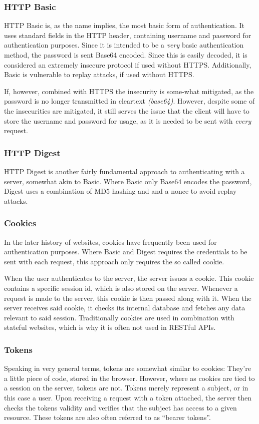 			\subsubsection{HTTP Basic}
				HTTP Basic is, as the name implies, the most basic form of authentication. It uses standard fields in the HTTP header, containing username and password for authentication purposes. Since it is intended to be a \emph{very} basic authentication method, the password is sent Base64 encoded. Since this is easily decoded, it is considered an extremely insecure protocol if used without HTTPS. Additionally, Basic is vulnerable to replay attacks, if used without HTTPS.

				If, however, combined with HTTPS the insecurity is some-what mitigated, as the password is no longer transmitted in cleartext \emph{(base64)}. However, despite some of the insecurities are mitigated, it still serves the issue that the client will have to store the username and password for usage, as it is needed to be sent with \emph{every} request.

			\subsubsection{HTTP Digest}
				HTTP Digest is another fairly fundamental approach to authenticating with a server, somewhat akin to Basic. Where Basic only Base64 encodes the password, Digest uses a combination of MD5 hashing and and a nonce to avoid replay attacks. 

			\subsubsection{Cookies}
				In the later history of websites, cookies have frequently been used for authentication purposes. Where Basic and Digest requires the credentials to be sent with each request, this approach only requires the so called cookie.

				When the user authenticates to the server, the server issues a cookie. This cookie contains a specific session id, which is also stored on the server. Whenever a request is made to the server, this cookie is then passed along with it. When the server receives said cookie, it checks its internal database and fetches any data relevant to said session. Traditionally cookies are used in combination with stateful websites, which is why it is often not used in RESTful APIs.

			\subsubsection{Tokens}
				Speaking in very general terms, tokens are somewhat similar to cookies: They're a little piece of code, stored in the browser. However, where as cookies are tied to a session on the server, tokens are not. Tokens merely represent a subject, or in this case a user. Upon receiving a request with a token attached, the server then checks the tokens validity and verifies that the subject has access to a given resource. These tokens are also often referred to as ``bearer tokens''.

